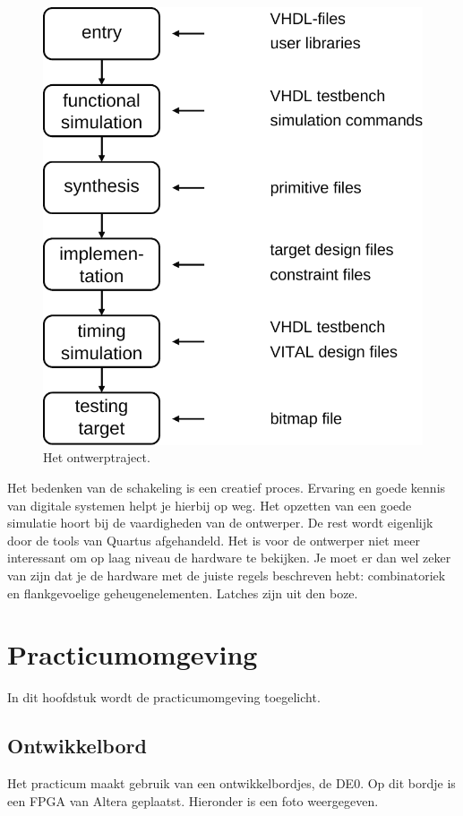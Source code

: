 \documentclass[a4paper,12pt,fleqn,twoside]{book}
\begin{document}
\begin{figure}[H]
\centering
\includegraphics[scale=0.63]{009designflow.pdf}
\caption{Het ontwerptraject.}
\label{fig:009designflow}
\end{figure}

Het bedenken van de schakeling is een creatief proces. Ervaring en goede kennis
van digitale systemen helpt je hierbij op weg. Het opzetten van een goede
simulatie hoort bij de vaardigheden van de ontwerper. De rest wordt eigenlijk
door de tools van Quartus afgehandeld. Het is voor de ontwerper niet meer
interessant om op laag niveau de hardware te bekijken. Je moet er dan
wel zeker van zijn dat je de hardware met de juiste regels beschreven hebt:
combinatoriek en flankgevoelige geheugenelementen. Latches zijn uit den boze.


\chapter{Practicumomgeving}
\label{chap:practicumomgeving}
In dit hoofdstuk wordt de practicumomgeving toegelicht.


\section{Ontwikkelbord}
\label{sec:ontwikkelbord}
Het practicum maakt gebruik van een ontwikkelbordjes, de DE0. Op dit bordje
is een FPGA van Altera geplaatst. Hieronder is een foto weergegeven.
\end{document}
